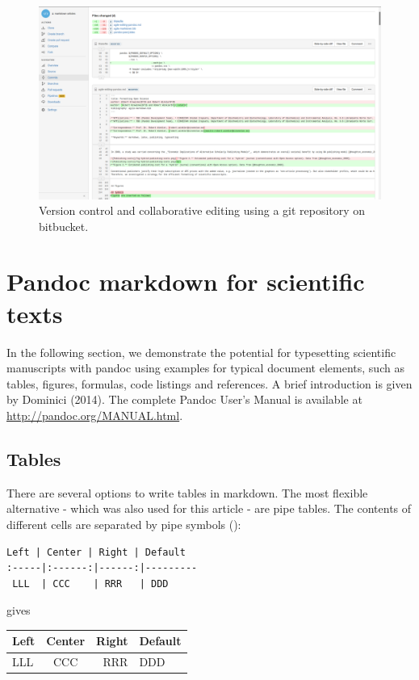 \documentclass[10pt,fleqn]{wlpeerj}
\begin{document}
\begin{figure}[htbp]
\centering
\includegraphics{Fig7.png}
\caption{Version control and collaborative editing using a git
repository on bitbucket.}
\end{figure}

\section{Pandoc markdown for scientific
texts}\label{pandoc-markdown-for-scientific-texts}

In the following section, we demonstrate the potential for typesetting
scientific manuscripts with pandoc using examples for typical document
elements, such as tables, figures, formulas, code listings and
references. A brief introduction is given by Dominici (2014). The
complete Pandoc User's Manual is available at
\url{http://pandoc.org/MANUAL.html}.

\subsection{Tables}\label{tables}

There are several options to write tables in markdown. The most flexible
alternative - which was also used for this article - are pipe tables.
The contents of different cells are separated by pipe symbols
(\texttt{\textbar{}}):

\begin{verbatim}
Left | Center | Right | Default
:-----|:------:|------:|---------
 LLL  | CCC    | RRR   | DDD
\end{verbatim}

gives

\begin{longtable}[c]{@{}lcrl@{}}
\toprule
Left & Center & Right & Default\tabularnewline
\midrule
\endhead
LLL & CCC & RRR & DDD\tabularnewline
\bottomrule
\end{longtable}
\end{document}
